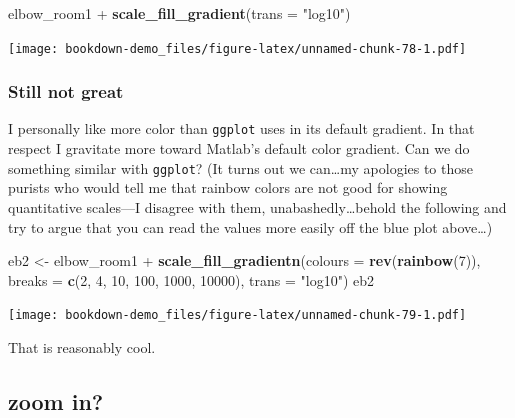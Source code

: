 \documentclass[]{book}
\newenvironment{Shaded}{\begin{snugshade}}{\end{snugshade}}
\newcommand{\KeywordTok}[1]{\textcolor[rgb]{0.13,0.29,0.53}{\textbf{{#1}}}}
\newcommand{\DataTypeTok}[1]{\textcolor[rgb]{0.13,0.29,0.53}{{#1}}}
\newcommand{\DecValTok}[1]{\textcolor[rgb]{0.00,0.00,0.81}{{#1}}}
\newcommand{\StringTok}[1]{\textcolor[rgb]{0.31,0.60,0.02}{{#1}}}
\newcommand{\NormalTok}[1]{{#1}}
\theoremstyle{definition}
\theoremstyle{definition}
\theoremstyle{remark}
\begin{document}
\begin{Shaded}
\begin{Highlighting}[]
\NormalTok{elbow_room1 +}\StringTok{ }\KeywordTok{scale_fill_gradient}\NormalTok{(}\DataTypeTok{trans =} \StringTok{"log10"}\NormalTok{)}
\end{Highlighting}
\end{Shaded}

\texttt{[image: bookdown-demo\_files/figure-latex/unnamed-chunk-78-1.pdf]}

\subsubsection{Still not great}\label{still-not-great}

I personally like more color than \texttt{ggplot} uses in its default
gradient. In that respect I gravitate more toward Matlab's default color
gradient. Can we do something similar with \texttt{ggplot}? (It turns
out we can\ldots{}my apologies to those purists who would tell me that
rainbow colors are not good for showing quantitative scales---I disagree
with them, unabashedly\ldots{}behold the following and try to argue that
you can read the values more easily off the blue plot above\ldots{})

\begin{Shaded}
\begin{Highlighting}[]
\NormalTok{eb2 <-}\StringTok{ }\NormalTok{elbow_room1 +}\StringTok{ }
\StringTok{    }\KeywordTok{scale_fill_gradientn}\NormalTok{(}\DataTypeTok{colours =} \KeywordTok{rev}\NormalTok{(}\KeywordTok{rainbow}\NormalTok{(}\DecValTok{7}\NormalTok{)),}
                         \DataTypeTok{breaks =} \KeywordTok{c}\NormalTok{(}\DecValTok{2}\NormalTok{, }\DecValTok{4}\NormalTok{, }\DecValTok{10}\NormalTok{, }\DecValTok{100}\NormalTok{, }\DecValTok{1000}\NormalTok{, }\DecValTok{10000}\NormalTok{),}
                         \DataTypeTok{trans =} \StringTok{"log10"}\NormalTok{)}
\NormalTok{eb2}
\end{Highlighting}
\end{Shaded}

\texttt{[image: bookdown-demo\_files/figure-latex/unnamed-chunk-79-1.pdf]}

That is reasonably cool.

\subsection{zoom in?}\label{zoom-in}
\end{document}

